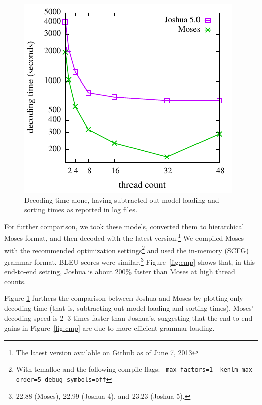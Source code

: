 \documentclass[11pt]{article}
\begin{document}
\begin{figure}[!t]
  \begin{center}
    \includegraphics[width=0.99\linewidth]{plots/decoding-only.pdf}
  \end{center}
  \caption{Decoding time alone, having subtracted out model loading
    and sorting times as reported in log files.}
  \label{fig:decoding-only}
\end{figure}

For further comparison, we took these models, converted them to
hierarchical Moses format, and then decoded with the latest
version.\footnote{The latest version available on Github as of June 7,
  2013} We compiled Moses with the recommended optimization
settings\footnote{With tcmalloc and the following compile flags:
  \texttt{--max-factors=1 --kenlm-max-order=5 debug-symbols=off}} and
used the in-memory (SCFG) grammar format.  BLEU scores were
similar.\footnote{22.88 (Moses), 22.99 (Joshua 4), and 23.23 (Joshua
  5).}  Figure~\ref{fig:cmp} shows that, in this end-to-end setting,
Joshua is about 200\% faster than Moses at high thread counts.

Figure \ref{fig:decoding-only} furthers the comparison between Joshua
and Moses by plotting only decoding time (that is, subtracting out
model loading and sorting times). Moses' decoding speed is 2--3 times
faster than Joshua's, suggesting that the end-to-end gains in
Figure~\ref{fig:cmp} are due to more efficient grammar loading.
\end{document}
